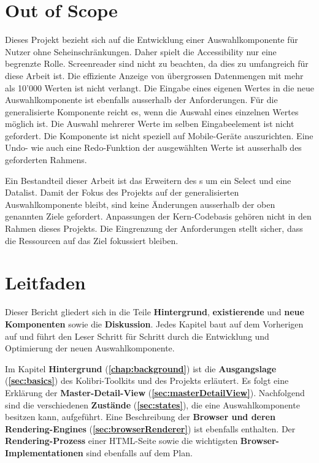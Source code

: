 \section{Out of Scope}
\label{sec:outOfScope}

Dieses Projekt bezieht sich auf die Entwicklung einer Auswahlkomponente für Nutzer ohne Seheinschränkungen. 
Daher spielt die Accessibility nur eine begrenzte Rolle. 
Screenreader sind nicht zu beachten, da dies zu umfangreich für diese Arbeit ist. 
Die effiziente Anzeige von übergrossen Datenmengen mit mehr als 10'000 Werten ist nicht verlangt. 
Die Eingabe eines eigenen Wertes in die neue Auswahlkomponente ist ebenfalls ausserhalb der Anforderungen. 
Für die generalisierte Komponente reicht es, wenn die Auswahl eines einzelnen Wertes möglich ist. 
Die Auswahl mehrerer Werte im selben Eingabeelement ist nicht gefordert. 
Die Komponente ist nicht speziell auf Mobile-Geräte auszurichten. 
Eine Undo- wie auch eine Redo-Funktion der ausgewählten Werte ist ausserhalb des geforderten Rahmens. 

Ein Bestandteil dieser Arbeit ist das Erweitern des s um ein Select und eine Datalist. 
Damit der Fokus des Projekts auf der generalisierten Auswahlkomponente bleibt, sind keine Änderungen ausserhalb der oben genannten Ziele gefordert. 
Anpassungen der Kern-Codebasis gehören nicht in den Rahmen dieses Projekts. 
Die Eingrenzung der Anforderungen stellt sicher, dass die Ressourcen auf das Ziel fokussiert bleiben. 


\section{Leitfaden}
\label{sec:tocTexted}

Dieser Bericht gliedert sich in die Teile \textbf{Hintergrund}, \textbf{existierende} und \textbf{neue Komponenten} sowie die \textbf{Diskussion}. 
Jedes Kapitel baut auf dem Vorherigen auf und führt den Leser Schritt für Schritt durch die Entwicklung und Optimierung der neuen Auswahlkomponente. 

Im Kapitel \textbf{Hintergrund} (\textbf{\ref{chap:background}}) ist die \textbf{Ausgangslage} (\textbf{\ref{sec:basics}}) des Kolibri-Toolkits und des Projekts erläutert. 
Es folgt eine Erklärung der \textbf{Master-Detail-View} (\textbf{\ref{sec:masterDetailView}}). 
Nachfolgend sind die verschiedenen \textbf{Zustände} (\textbf{\ref{sec:states}}), die eine Auswahlkomponente besitzen kann, aufgeführt. 
Eine Beschreibung der \textbf{Browser und deren Rendering-Engines} (\textbf{\ref{sec:browserRenderer}}) ist ebenfalls enthalten. 
Der \textbf{Rendering-Prozess} einer HTML-Seite sowie die wichtigsten \textbf{Browser-Implementationen} sind ebenfalls auf dem Plan. 

